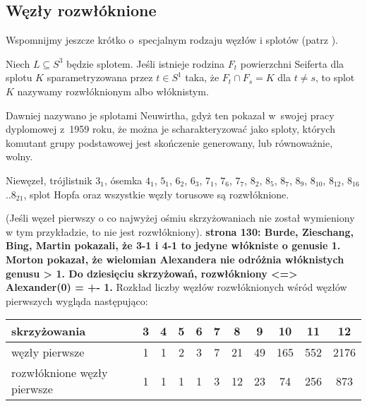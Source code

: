 
\subsection{Węzły rozwłóknione}
%
%
Wspomnijmy jeszcze krótko o~specjalnym rodzaju węzłów i splotów (patrz \cite[s. 49-50]{kawauchi96}).

\begin{definition}
    Niech $L \subseteq S^3$ będzie splotem.
    Jeśli istnieje rodzina $F_t$ powierzchni Seiferta dla splotu $K$ sparametryzowana przez $t \in S^1$ taka, że $F_t \cap F_s = K$ dla $t \neq s$, to splot $K$ nazywamy rozwłóknionym albo włóknistym.
\end{definition}

%
Dawniej nazywano je splotami Neuwirtha, gdyż ten pokazał w~swojej pracy dyplomowej z~1959 roku, że można je scharakteryzować jako sploty, których komutant grupy podstawowej jest skończenie generowany, lub równoważnie, wolny.

\begin{example}
    Niewęzeł, trójlistnik $3_1$, ósemka $4_1$, $5_{1}$, $6_{2}$, $6_{3}$, $7_{1}$, $7_{6}$, $7_{7}$, $8_{2}$, $8_{5}$, $8_{7}$, $8_{9}$, $8_{10}$, $8_{12}$, $8_{16}$..$8_{21}$, splot Hopfa oraz wszystkie węzły torusowe są rozwłóknione.
\end{example}

(Jeśli węzeł pierwszy o co najwyżej ośmiu skrzyżowaniach nie został wymieniony w tym przykładzie, to nie jest rozwłókniony).
{\color{red} \textbf{\cite{burde14} strona 130: Burde, Zieschang, Bing, Martin pokazali, że 3-1 i 4-1 to jedyne włókniste o genusie 1. Morton pokazał, że wielomian Alexandera nie odróżnia włóknistych genusu > 1. Do dziesięciu skrzyżowań, rozwłókniony <=> Alexander(0) = +- 1.}}
Rozkład liczby węzłów rozwłóknionych wśród węzłów pierwszych wygląda następująco:

\renewcommand*{\arraystretch}{1.4}
\footnotesize
\begin{longtable}{lcccccccccc}
    \hline
    \textbf{skrzyżowania} & 3 & 4 & 5 & 6 & 7 & 8 & 9 & 10 &  11 &  12 \\ \hline \endhead
    węzły pierwsze & 1 & 1 & 2 & 3 & 7 & 21 & 49 & 165 & 552 & 2176 \\
    rozwłóknione węzły pierwsze & 1 & 1 & 1 & 1 & 3 & 12 & 23 & 74 & 256 & 873 \\
    \hline
\end{longtable}
\normalsize

